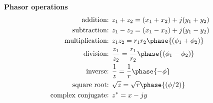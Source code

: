 \documentclass{article}
\begin{document}
\textbf{Phasor operations}
\begin{align*}
    \text{addition: }& z_1+z_2 = (x_1+x_2)+j(y_1+y_2) \\
    \text{subtraction: }& z_1-z_2 = (x_1-x_2)+j(y_1-y_2) \\
    \text{multiplication: }& z_1z_2 = r_1r_2\phase{(\phi_1+\phi_2)} \\
    \text{division: }& \frac{z_1}{z_2} = \frac{r_1}{r_2}\phase{(\phi_1-\phi_2)} \\
    \text{inverse: }& \frac{1}{z} = \frac{1}{r}\phase{-\phi} \\
    \text{square root: }& \sqrt{z} = \sqrt{r}\phase{(\phi/2)} \\
    \text{complex conjugate: }& z^* = x-jy \\
\end{align*}
\end{document}
